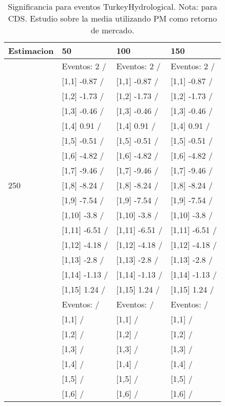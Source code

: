 \begin{table}

\caption{Significancia para eventos TurkeyHydrological. Nota: para CDS. Estudio sobre la media utilizando PM como retorno de mercado.}
\centering
\begin{tabular}[t]{llll}
\toprule
Estimacion & 50 & 100 & 150\\
\midrule
 & Eventos:  2 / & Eventos:  2 / & Eventos:  2 /\\
 & {}[1,1] -0.87  / & {}[1,1] -0.87  / & {}[1,1] -0.87  /\\
 & {}[1,2] -1.73  / & {}[1,2] -1.73  / & {}[1,2] -1.73  /\\
 & {}[1,3] -0.46  / & {}[1,3] -0.46  / & {}[1,3] -0.46  /\\
 & {}[1,4] 0.91  / & {}[1,4] 0.91  / & {}[1,4] 0.91  /\\
\addlinespace
 & {}[1,5] -0.51  / & {}[1,5] -0.51  / & {}[1,5] -0.51  /\\
 & {}[1,6] -4.82  / & {}[1,6] -4.82  / & {}[1,6] -4.82  /\\
 & {}[1,7] -9.46  / & {}[1,7] -9.46  / & {}[1,7] -9.46  /\\
250 & {}[1,8] -8.24  / & {}[1,8] -8.24  / & {}[1,8] -8.24  /\\
 & {}[1,9] -7.54  / & {}[1,9] -7.54  / & {}[1,9] -7.54  /\\
\addlinespace
 & {}[1,10] -3.8  / & {}[1,10] -3.8  / & {}[1,10] -3.8  /\\
 & {}[1,11] -6.51  / & {}[1,11] -6.51  / & {}[1,11] -6.51  /\\
 & {}[1,12] -4.18  / & {}[1,12] -4.18  / & {}[1,12] -4.18  /\\
 & {}[1,13] -2.8  / & {}[1,13] -2.8  / & {}[1,13] -2.8  /\\
 & {}[1,14] -1.13  / & {}[1,14] -1.13  / & {}[1,14] -1.13  /\\
\addlinespace
 & {}[1,15] 1.24  / & {}[1,15] 1.24  / & {}[1,15] 1.24  /\\
 & Eventos:   / & Eventos:   / & Eventos:   /\\
 & {}[1,1]  / & {}[1,1]  / & {}[1,1]  /\\
 & {}[1,2]  / & {}[1,2]  / & {}[1,2]  /\\
 & {}[1,3]  / & {}[1,3]  / & {}[1,3]  /\\
\addlinespace
 & {}[1,4]  / & {}[1,4]  / & {}[1,4]  /\\
 & {}[1,5]  / & {}[1,5]  / & {}[1,5]  /\\
 & {}[1,6]  / & {}[1,6]  / & {}[1,6]  /\\

\end{tabular}
\end{table}
